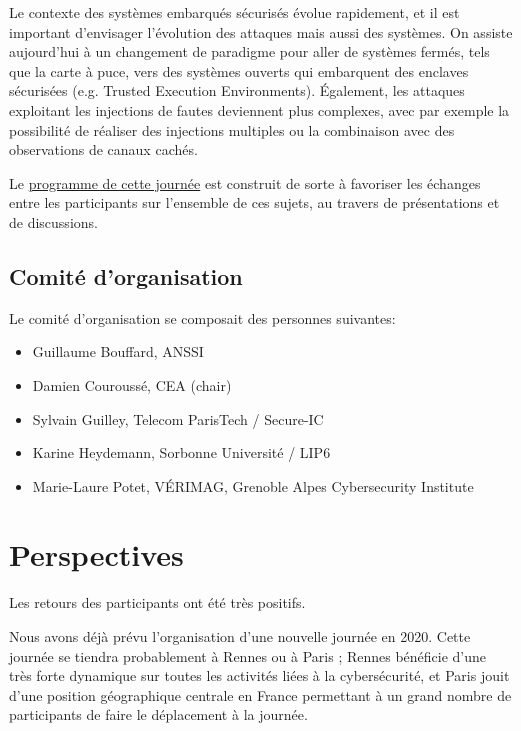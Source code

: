 \documentclass[a4paper,11pt]{article}
\begin{document}
Le contexte des systèmes embarqués sécurisés évolue
rapidement, et il est important d’envisager l’évolution des
attaques mais aussi des systèmes.
On assiste aujourd’hui à un changement de paradigme pour aller de
systèmes fermés, tels que la carte à puce, vers des systèmes ouverts qui
embarquent des enclaves sécurisées (e.g. Trusted Execution
Environments).  Également, les attaques exploitant les injections de
fautes deviennent plus complexes, avec par exemple la possibilité de
réaliser des injections multiples ou la combinaison avec des
observations de canaux cachés.

Le \href{./programme.html}{programme de cette journée} est construit de sorte à favoriser les échanges entre les participants sur
l’ensemble de ces sujets, au travers de présentations et de
discussions.

\subsection{Comité d'organisation}
\label{sec:orgbb70232}

Le comité d'organisation se composait des personnes suivantes:

\begin{itemize}
\item Guillaume Bouffard,  ANSSI
\item Damien Couroussé, CEA  (chair)
\item Sylvain Guilley, Telecom ParisTech / Secure-IC
\item Karine Heydemann, Sorbonne Université / LIP6
\item Marie-Laure Potet, VÉRIMAG,  Grenoble Alpes Cybersecurity Institute
\end{itemize}

\section{Perspectives}
\label{sec:org4c08a55}

Les retours des participants ont été très positifs.

Nous avons déjà prévu l'organisation d'une nouvelle journée en 2020.
Cette journée se tiendra probablement à Rennes ou à Paris ;  Rennes
bénéficie d'une très forte dynamique sur toutes les activités liées à
la cybersécurité, et Paris jouit d'une position géographique centrale
en France permettant à un grand nombre de participants de faire le
déplacement à la journée.
\end{document}
